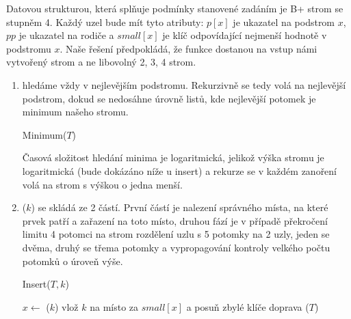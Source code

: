 \documentclass[12pt]{iv003}
\begin{document}

Datovou strukturou, která splňuje podmínky stanovené zadáním je B+ strom se stupněm 4.
Každý uzel bude mít tyto atributy: $p[x]$ je ukazatel na podstrom $x$, $pp$ je ukazatel na rodiče a $small[x]$ je klíč odpovídající nejmenší hodnotě v podstromu $x$.
Naše řešení předpokládá, že funkce dostanou na vstup námi vytvořený strom a ne libovolný 2, 3, 4 strom.

\begin{enumerate}
	\item \ffminimum hledáme vždy v nejlevějším podstromu. Rekurzivně se tedy volá \ffminimum na nejlevější podstrom, dokud se nedosáhne úrovně listů, kde nejlevější potomek je minimum našeho stromu.\\
	
	\begin{procedure}[H]
		\caption{Minimum($T$)}
		 {
			 
		}
	\end{procedure}
	Časová složitost hledání minima je logaritmická, jelikož výška stromu je logaritmická (bude dokázáno níže u insert) a rekurze se v každém zanoření volá na strom s výškou o jedna menší.
	\item \ffinsert($k$) se skládá ze 2 částí. První částí je nalezení správného místa, na které prvek patří a zařazení na toto místo, druhou fází je v případě překročení limitu 4 potomci na strom rozdělení uzlu s 5 potomky na 2 uzly, jeden se dvěma, druhý se třema potomky a vypropagování kontroly velkého počtu potomků o úroveň výše.\\
	
	\begin{procedure}[H]
		\caption{Insert($T, k$) }
		$x \leftarrow $ \ffselectkey($k$) 
		 {
			vlož $k$ na místo za $small[x]$ a posuň zbylé klíče doprava \; 
			\ffcontrolnode($T$) \;
		}
	\end{procedure}
	

\end{enumerate}
\end{document}
